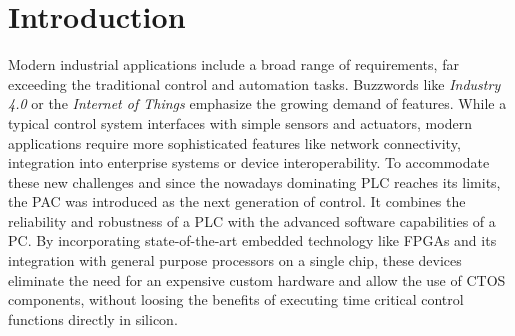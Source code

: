\chapter{Introduction}

Modern industrial applications include a broad range of requirements, far
exceeding the traditional control and automation tasks. Buzzwords like
\emph{Industry 4.0} or the \emph{Internet of Things} emphasize the growing
demand of features. While a typical control system interfaces with simple
sensors and actuators, modern applications require more sophisticated features
like network connectivity, integration into enterprise systems or device
interoperability. To accommodate these new challenges and since the nowadays
dominating \ac{PLC} reaches its limits, the \ac{PAC} was introduced as the
next generation of control. It combines the reliability and robustness of a
\ac{PLC} with the advanced software capabilities of a \ac{PC}. By
incorporating state-of-the-art embedded technology like \acp{FPGA} and its
integration with general purpose processors on a single chip, these devices
eliminate the need for an expensive custom hardware and allow  the use of
\ac{CTOS} components, without loosing the benefits of executing time critical
control functions directly in silicon.

